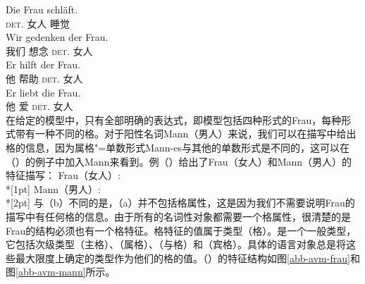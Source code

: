 \eal\settowidth{}
\ex 
\gll Die        Frau schläft. \\      
     \textsc{det}.\nom{} 女人 睡觉\\
\ex 
\gll Wir gedenken der Frau. \\ 
     我们 想念 \textsc{det}.\gen{} 女人\\
\ex 
\gll Er hilft der Frau.  \\    
     他 帮助 \textsc{det}.\dat{} 女人\\
\ex 
\gll Er liebt die Frau.   \\   
     他 爱 \textsc{det}.\acc{} 女人\\
\zl
在给定的模型中，只有全部明确的表达式，即模型包括四种形式的Frau，每种形式带有一种不同的格。对于阳性名词Mann（男人）来说，我们可以在描写中给出格的信息，因为属格"=单数形式Mann-es与其他的单数形式是不同的，这可以在（）的例子中加入Mann来看到。例（）给出了Frau（女人）和Mann（男人）的特征描写：
\eal
\ex\label{avm-frau}
Frau（女人）:\\*[1pt]
\ex\label{avm-mann}
Mann（男人）:\\*[2pt]
\zl
与（b）不同的是，（a）并不包括格属性，这是因为我们不需要说明Frau的描写中有任何格的信息。由于所有的名词性对象都需要一个格属性，很清楚的是Frau的结构必须也有一个格特征。格特征的值属于类型（格）。是一个一般类型，它包括次级类型（主格）、（属格）、（与格）和（宾格）。具体的语言对象总是将这些最大限度上确定的类型作为他们的格的值。（）的特征结构如图\ref{abb-avm-frau}和图\ref{abb-avm-mann}所示。
